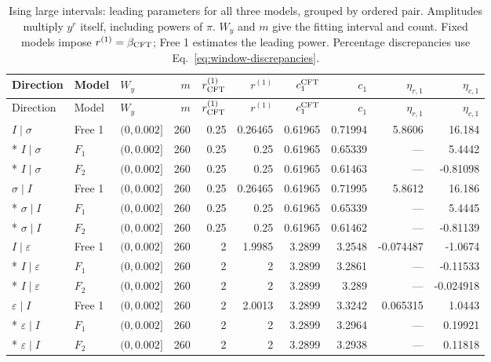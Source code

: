 \begingroup\setlength{\tabcolsep}{2pt}
\begin{longtable}{lllrrrrrrr}
\caption{Ising large intervals: leading parameters for all three models, grouped by ordered pair. Amplitudes multiply $y^r$ itself, including powers of $\pi$. $W_y$ and $m$ give the fitting interval and count. Fixed models impose $r^{(1)}=\beta_{\rm CFT}$; Free 1 estimates the leading power. Percentage discrepancies use Eq.~\eqref{eq:window-discrepancies}.}
\label{tab:window-large_ising-leading}\\\toprule
Direction & Model & $W_y$ & $m$ & $r^{(1)}_{\rm CFT}$ & $r^{(1)}$ & $c_1^{\rm CFT}$ & $c_1$ & $\eta_{r,1}$ & $\eta_{c,1}$\\\midrule
\endfirsthead
\toprule
Direction & Model & $W_y$ & $m$ & $r^{(1)}_{\rm CFT}$ & $r^{(1)}$ & $c_1^{\rm CFT}$ & $c_1$ & $\eta_{r,1}$ & $\eta_{c,1}$\\\midrule
\endhead
\bottomrule\endfoot
$I\mid \sigma$ & Free 1 & $(0,0.002]$ & 260 & 0.25 & 0.26465 & 0.61965 & 0.71994 & 5.8606 & 16.184\\*
$I\mid \sigma$ & $F_1$ & $(0,0.002]$ & 260 & 0.25 & 0.25 & 0.61965 & 0.65339 & --- & 5.4442\\*
$I\mid \sigma$ & $F_2$ & $(0,0.002]$ & 260 & 0.25 & 0.25 & 0.61965 & 0.61463 & --- & -0.81098\\
\midrule
$\sigma\mid I$ & Free 1 & $(0,0.002]$ & 260 & 0.25 & 0.26465 & 0.61965 & 0.71995 & 5.8612 & 16.186\\*
$\sigma\mid I$ & $F_1$ & $(0,0.002]$ & 260 & 0.25 & 0.25 & 0.61965 & 0.65339 & --- & 5.4445\\*
$\sigma\mid I$ & $F_2$ & $(0,0.002]$ & 260 & 0.25 & 0.25 & 0.61965 & 0.61462 & --- & -0.81139\\
\midrule
$I\mid \varepsilon$ & Free 1 & $(0,0.002]$ & 260 & 2 & 1.9985 & 3.2899 & 3.2548 & -0.074487 & -1.0674\\*
$I\mid \varepsilon$ & $F_1$ & $(0,0.002]$ & 260 & 2 & 2 & 3.2899 & 3.2861 & --- & -0.11533\\*
$I\mid \varepsilon$ & $F_2$ & $(0,0.002]$ & 260 & 2 & 2 & 3.2899 & 3.289 & --- & -0.024918\\
\midrule
$\varepsilon\mid I$ & Free 1 & $(0,0.002]$ & 260 & 2 & 2.0013 & 3.2899 & 3.3242 & 0.065315 & 1.0443\\*
$\varepsilon\mid I$ & $F_1$ & $(0,0.002]$ & 260 & 2 & 2 & 3.2899 & 3.2964 & --- & 0.19921\\*
$\varepsilon\mid I$ & $F_2$ & $(0,0.002]$ & 260 & 2 & 2 & 3.2899 & 3.2938 & --- & 0.11818\\

\end{longtable}
